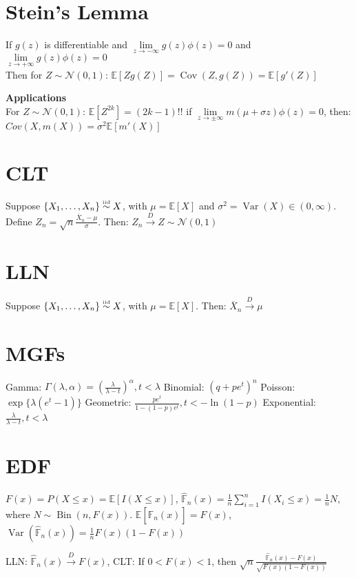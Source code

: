 \documentclass[twocolumn]{amsart}
\newcommand{\E}{\mathbb{E}}
\newcommand{\Cov}{\operatorname{Cov}}
\newcommand{\Var}{\operatorname{Var}}
\newcommand{\Bin}{\operatorname{Bin}}
\newcommand\iid{\mathrel{\overset{\makebox[0pt]{\mbox{\normalfont\tiny iid}}}{\sim}}}
\begin{document}
\section*{Stein's Lemma}
If \(g(z)\) is differentiable and \(\lim\limits_{z\to-\infty} g(z)\phi(z) = 0\) and \(\lim\limits_{z\to+\infty} g(z)\phi(z) = 0\) \\
Then for \(Z\sim\mathcal{N}(0, 1)\): $\E[Z g(Z)] = \Cov(Z, g(Z)) = \E[g'(Z)]$

\textbf{Applications}\\
For \(Z\sim\mathcal{N}(0,1)\): $\E[Z^{2k}] = (2k - 1)!!$
if \(\lim\limits_{z\to\pm\infty} m(\mu + \sigma z)\phi(z)=0\), then: $Cov(X,m(X)) = \sigma^{2}\E[m'(X)]$

\section*{CLT}
Suppose \(\{X_{1},\ldots,X_{n}\} \iid X\), with \(\mu = \E[X]\) and \(\sigma^{2}
= \Var(X) \in (0, \infty)\). Define
\(Z_{n}=\sqrt{n}\frac{\overline{X}_{n}-\mu}{\sigma}\). Then: $Z_{n} \overset{D}{\longrightarrow} Z\sim\mathcal{N}(0,1)$

\section*{LLN}
Suppose \(\{X_{1},\ldots,X_{n}\} \iid X\), with \(\mu = \E[X]\). Then: $\overline{X}_{n} \overset{D}{\longrightarrow} \mu$

\section*{MGFs}
Gamma: $\Gamma(\lambda,\alpha) =
\left(\frac{\lambda}{\lambda-t}\right)^{\alpha}, t < \lambda$
Binomial: $(q+pe^{t})^{n}$
Poisson: $\exp\{\lambda(e^{t} - 1)\}$
Geometric: $\frac{pe^{t}}{1-(1-p)e^{t}}, t<-\ln(1-p)$
Exponential: $\frac{\lambda}{\lambda-t}, t<\lambda$

\section*{EDF}
$F(x)=P(X\leq x)=\E[I(X\leq x)]$, $\hat{\mathbb{F}}_{n}(x) =
\frac{1}{n}\sum_{i=1}^{n}I(X_{i}\leq x) = \frac{1}{n}N$, where
$N\sim\Bin(n,F(x))$. $\E[\hat{\mathbb{F}}_{n}(x)] = F(x)$,
$\Var(\hat{\mathbb{F}}_{n}(x)) = \frac{1}{n}F(x)(1-F(x))$

LLN: $\hat{\mathbb{F}}_{n}(x) \overset{D}{\to} F(x)$, CLT: If $0<F(x)<1$, then
$\sqrt{n}\frac{\hat{\mathbb{F}}_{n}(x) - F(x)}{\sqrt{F(x)(1-F(x))}}$
\end{document}
